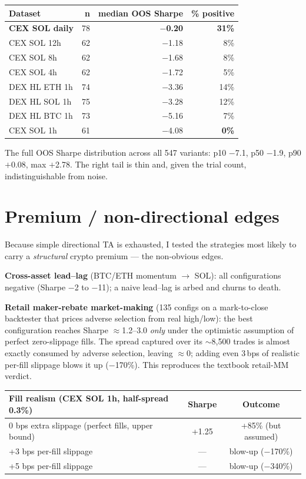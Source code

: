 \documentclass[11pt,a4paper]{article}
\begin{document}
\begin{center}
\small
\begin{tabular}{lrrr}
\toprule
Dataset & n & median OOS Sharpe & \% positive \\
\midrule
\textbf{CEX SOL daily} & 78 & \textbf{$-$0.20} & \textbf{31\%} \\
CEX SOL 12h & 62 & $-$1.18 & 8\% \\
CEX SOL 8h & 62 & $-$1.68 & 8\% \\
CEX SOL 4h & 62 & $-$1.72 & 5\% \\
DEX HL ETH 1h & 74 & $-$3.36 & 14\% \\
DEX HL SOL 1h & 75 & $-$3.28 & 12\% \\
DEX HL BTC 1h & 73 & $-$5.16 & 7\% \\
CEX SOL 1h & 61 & $-$4.08 & \textbf{0\%} \\
\bottomrule
\end{tabular}
\end{center}

The full OOS Sharpe distribution across all 547 variants: p10 $-$7.1, p50 $-$1.9, p90 $+$0.08, max $+$2.78. The right tail is thin and, given the trial count, indistinguishable from noise.

\section{Premium / non-directional edges}

Because simple directional TA is exhausted, I tested the strategies most likely to carry a \emph{structural} crypto premium --- the non-obvious edges.

\textbf{Cross-asset lead--lag} (BTC/ETH momentum $\to$ SOL): all configurations negative (Sharpe $-$2 to $-$11); a naive lead--lag is arbed and churns to death.

\textbf{Retail maker-rebate market-making} (135 configs on a mark-to-close backtester that prices adverse selection from real high/low): the best configuration reaches Sharpe $\approx$1.2--3.0 \emph{only} under the optimistic assumption of perfect zero-slippage fills. The spread captured over its $\sim$8{,}500 trades is almost exactly consumed by adverse selection, leaving $\approx$0; adding even 3\,bps of realistic per-fill slippage blows it up ($-$170\%). This reproduces the textbook retail-MM verdict.

\begin{center}
\small
\begin{tabular}{lcc}
\toprule
Fill realism (CEX SOL 1h, half-spread 0.3\%) & Sharpe & Outcome \\
\midrule
0 bps extra slippage (perfect fills, upper bound) & +1.25 & +85\% (but assumed) \\
+3 bps per-fill slippage & --- & blow-up ($-$170\%) \\
+5 bps per-fill slippage & --- & blow-up ($-$340\%) \\
\bottomrule
\end{tabular}
\end{center}
\end{document}
